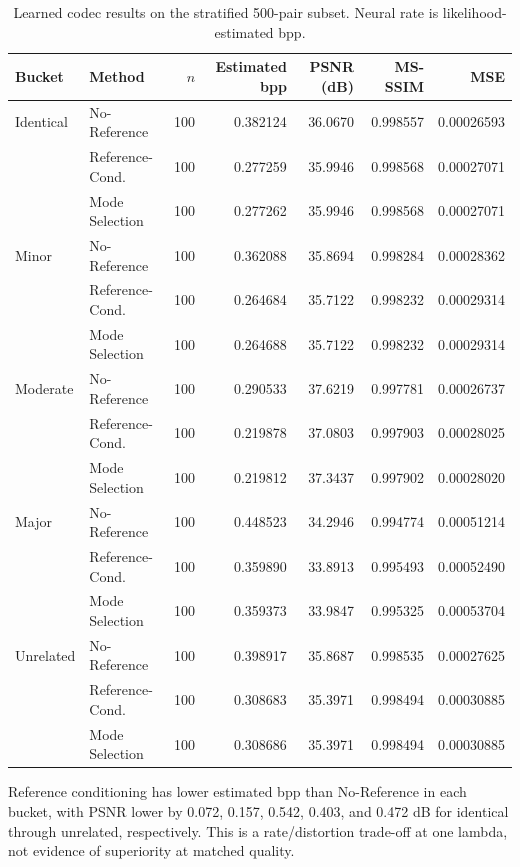 \documentclass[conference]{IEEEtran}
\begin{document}
\begin{table}[t]
\caption{Learned codec results on the stratified 500-pair subset. Neural rate is likelihood-estimated bpp.}
\label{tab:learned}
\centering
\scriptsize
\begin{tabular}{llrrrrr}
\toprule
Bucket & Method & $n$ & Estimated bpp & PSNR (dB) & MS-SSIM & MSE\\
\midrule
Identical & No-Reference & 100 & 0.382124 & 36.0670 & 0.998557 & 0.00026593\\
& Reference-Cond. & 100 & 0.277259 & 35.9946 & 0.998568 & 0.00027071\\
& Mode Selection & 100 & 0.277262 & 35.9946 & 0.998568 & 0.00027071\\
\midrule
Minor & No-Reference & 100 & 0.362088 & 35.8694 & 0.998284 & 0.00028362\\
& Reference-Cond. & 100 & 0.264684 & 35.7122 & 0.998232 & 0.00029314\\
& Mode Selection & 100 & 0.264688 & 35.7122 & 0.998232 & 0.00029314\\
\midrule
Moderate & No-Reference & 100 & 0.290533 & 37.6219 & 0.997781 & 0.00026737\\
& Reference-Cond. & 100 & 0.219878 & 37.0803 & 0.997903 & 0.00028025\\
& Mode Selection & 100 & 0.219812 & 37.3437 & 0.997902 & 0.00028020\\
\midrule
Major & No-Reference & 100 & 0.448523 & 34.2946 & 0.994774 & 0.00051214\\
& Reference-Cond. & 100 & 0.359890 & 33.8913 & 0.995493 & 0.00052490\\
& Mode Selection & 100 & 0.359373 & 33.9847 & 0.995325 & 0.00053704\\
\midrule
Unrelated & No-Reference & 100 & 0.398917 & 35.8687 & 0.998535 & 0.00027625\\
& Reference-Cond. & 100 & 0.308683 & 35.3971 & 0.998494 & 0.00030885\\
& Mode Selection & 100 & 0.308686 & 35.3971 & 0.998494 & 0.00030885\\
\bottomrule
\end{tabular}
\end{table}

Reference conditioning has lower estimated bpp than No-Reference in each bucket, with PSNR lower by 0.072, 0.157, 0.542, 0.403, and 0.472 dB for identical through unrelated, respectively. This is a rate/distortion trade-off at one lambda, not evidence of superiority at matched quality.
\end{document}

